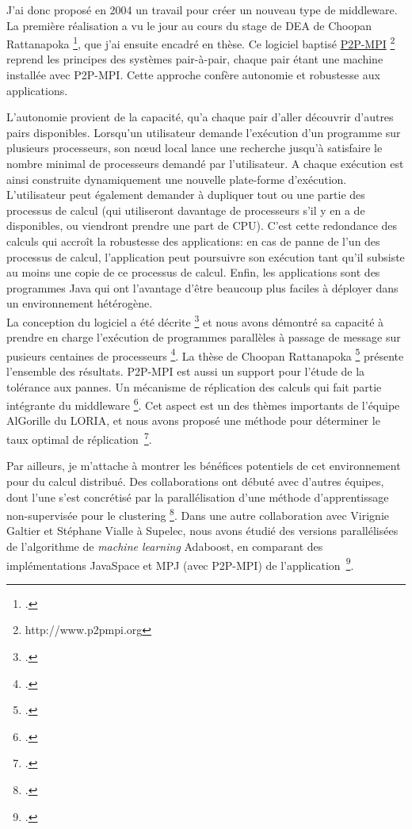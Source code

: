 \documentclass[11pt]{article}
\newcommand{\pmpi}{\mbox{\textsc{P2P-MPI}}}
\begin{document}
J'ai donc proposé en 2004 un travail pour créer un nouveau type de middleware. La première réalisation
a vu le jour au cours du stage de DEA de Choopan Rattanapoka \footcite{icps-2004-139}, 
que j'ai ensuite encadré en thèse. 
Ce logiciel baptisé 
\href{http://www.p2pmpi.org}{\pmpi}%
\footnote{http://www.p2pmpi.org}
reprend les principes des systèmes pair-à-pair, chaque pair étant une machine installée 
avec {\pmpi}. Cette approche confère autonomie et robustesse aux applications.

L'autonomie provient de la capacité, qu'a chaque pair d'aller découvrir d'autres pairs 
disponibles.
Lorsqu'un utilisateur demande l'exécution d'un programme sur plusieurs processeurs,
son n{\oe}ud local lance une recherche jusqu'à satisfaire le nombre minimal de processeurs 
demandé par l'utilisateur. 
A chaque exécution est ainsi construite dynamiquement une nouvelle plate-forme d'exécution.
L'utilisateur peut également demander à dupliquer tout ou une partie des processus de calcul 
(qui utiliseront davantage de processeurs s'il y en a de disponibles, ou viendront prendre une part de CPU). 
C'est cette redondance des calculs qui accroît la robustesse des applications: 
en cas de panne de l'un des processus de calcul, l'application peut poursuivre son exécution
tant qu'il subsiste au moins une copie de ce processus de calcul.
Enfin, les applications sont des programmes Java qui ont l'avantage d'être beaucoup
plus faciles à déployer dans un environnement hétérogène.\\


La conception du logiciel a été décrite \footcite{icps-2007-182,icps-2005-155} et nous avons démontré
sa capacité à prendre en charge l'exécution de programmes parallèles à passage de message sur pusieurs
centaines de processeurs \footcite{icps-2008-193}. La thèse de Choopan Rattanapoka \footcite{icps-2008-208} 
présente l'ensemble des résultats.
{\pmpi} est aussi un support pour l'étude de la tolérance aux pannes. Un mécanisme de réplication
des calculs qui fait partie intégrante du middleware \footcite{icps-2007-185}. Cet aspect est un des thèmes
importants de l'équipe AlGorille du LORIA, et nous avons proposé une méthode pour déterminer
le taux optimal de réplication~\footcite{icps-2009-217}.

Par ailleurs, je m'attache à montrer les bénéfices potentiels de cet environnement pour du calcul 
distribué. Des collaborations ont débuté avec d'autres équipes, dont l'une s'est concrétisé
par la parallélisation d'une méthode d'apprentissage non-supervisée pour le clustering \footcite{icps-2008-188}.
Dans une autre collaboration avec Virignie Galtier et Stéphane Vialle à Supelec, nous
avons étudié des versions parallélisées de l'algorithme de \emph{machine learning} Adaboost, 
en comparant des implémentations JavaSpace et MPJ (avec {\pmpi}) de l'application~\footcite{icps-2009-219}.
\end{document}
